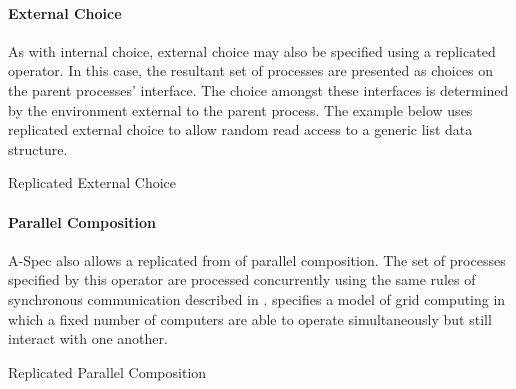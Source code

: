\documentclass[letterpaper,10pt,draft]{book}
\begin{document}
\paragraph{External Choice}
   \label{sect:ReplExternal}

As with internal choice, external choice may also be specified using a replicated
operator.  In this case, the resultant set of processes are presented as choices
on the parent processes' interface.  The choice amongst these interfaces is determined
by the environment external to the parent process.  The example below uses replicated
external choice to allow random read access to a generic list data structure.

\begin{example}
\begin{minipage}[t]{0.49\linewidth}
   
\end{minipage}
\begin{minipage}[t]{0.49\linewidth}
   \azbox
   
\end{minipage}

   \caption{Replicated External Choice}
   \label{ex:ReplExternal}
\end{example}

\paragraph{Parallel Composition}
   \label{sect:ReplParallel}

A-Spec also allows a replicated from of parallel composition.  The set of processes
specified by this operator are processed concurrently using the same rules of synchronous
communication described in .   specifies
a model of grid computing in which a fixed number of computers are able to operate
simultaneously but still interact with one another.

\begin{example}
\begin{minipage}[t]{0.49\linewidth}
   
\end{minipage}
\begin{minipage}[t]{0.49\linewidth}
   \azbox
   
\end{minipage}

   \caption{Replicated Parallel Composition}
   \label{ex:ReplParallel}
\end{example}
\end{document}
